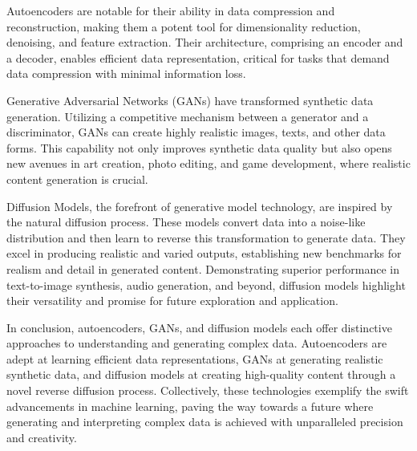 \documentclass{article}
\begin{document}
			Autoencoders are notable for their ability in data compression and reconstruction, making them a potent tool for dimensionality reduction, denoising, and feature extraction. Their architecture, comprising an encoder and a decoder, enables efficient data representation, critical for tasks that demand data compression with minimal information loss.

			Generative Adversarial Networks (GANs) have transformed synthetic data generation. Utilizing a competitive mechanism between a generator and a discriminator, GANs can create highly realistic images, texts, and other data forms. This capability not only improves synthetic data quality but also opens new avenues in art creation, photo editing, and game development, where realistic content generation is crucial.

			Diffusion Models, the forefront of generative model technology, are inspired by the natural diffusion process. These models convert data into a noise-like distribution and then learn to reverse this transformation to generate data. They excel in producing realistic and varied outputs, establishing new benchmarks for realism and detail in generated content. Demonstrating superior performance in text-to-image synthesis, audio generation, and beyond, diffusion models highlight their versatility and promise for future exploration and application.

			In conclusion, autoencoders, GANs, and diffusion models each offer distinctive approaches to understanding and generating complex data. Autoencoders are adept at learning efficient data representations, GANs at generating realistic synthetic data, and diffusion models at creating high-quality content through a novel reverse diffusion process. Collectively, these technologies exemplify the swift advancements in machine learning, paving the way towards a future where generating and interpreting complex data is achieved with unparalleled precision and creativity.



		\newpage
\end{document}

